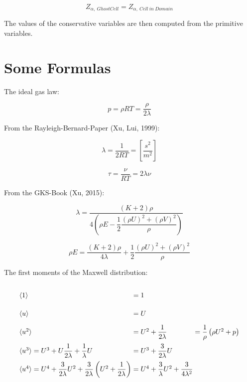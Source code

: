 \documentclass[
	pdftex,             %
	12pt,				%
	a4paper,		   	%
	english,				%
	oneside,			%
]{article}
\newcommand{\mom}[1]{\langle #1 \rangle}
\begin{document}
\begin{equation}
Z_{\alpha,~GhostCell} = Z_{\alpha,~Cell~in~Domain}
\end{equation}

The values of the conservative variables are then computed from the primitive variables.

\clearpage

\section{Some Formulas}

The ideal gas law:

\begin{equation}
p = \rho RT = \dfrac{\rho}{2 \lambda}
\end{equation}

From the Rayleigh-Bernard-Paper (Xu, Lui, 1999):

\begin{equation}
\lambda = \frac{1}{2RT} = \left[ \dfrac{s^2}{m^2} \right]
\end{equation}

\begin{equation}
\tau = \frac{\nu}{RT} = 2\lambda\nu
\end{equation}

From the GKS-Book (Xu, 2015):

\begin{equation}
\lambda =\frac{(K+2)\rho}
{4\left( \rho E - \dfrac{1}{2} \dfrac{(\rho U)^2 + (\rho V)^2}{\rho}  \right)}
\end{equation}

\begin{equation}
\rho E = \dfrac{(K+2)\rho}{4\lambda} + \dfrac{1}{2} \dfrac{(\rho U)^2 + (\rho V)^2}{\rho}
\end{equation}

The first moments of the Maxwell distribution:

\begin{equation}
\arraycolsep=1.4pt\def\arraystretch{2.2}
\begin{array}{lcll}
\mom{1} &=& 1 &\\
\mom{u} &=& U &\\
\mom{u^2} &=& U^2 + \dfrac{1}{2\lambda} & = \dfrac{1}{\rho} \left( \rho U^2 + p \right) \\
\mom{u^3} = U^3 + U\dfrac{1}{2\lambda} + \dfrac{1}{\lambda} U &=& U^3 + \dfrac{3}{2\lambda} U &\\
\mom{u^4} = U^4 + \dfrac{3}{2\lambda} U^2 + \dfrac{3}{2\lambda} \left(U^2 + \dfrac{1}{2\lambda} \right)
		  &=& U^4 + \dfrac{3}{\lambda} U^2 + \dfrac{3}{4\lambda^2}&
\end{array}
\end{equation}
\end{document}
